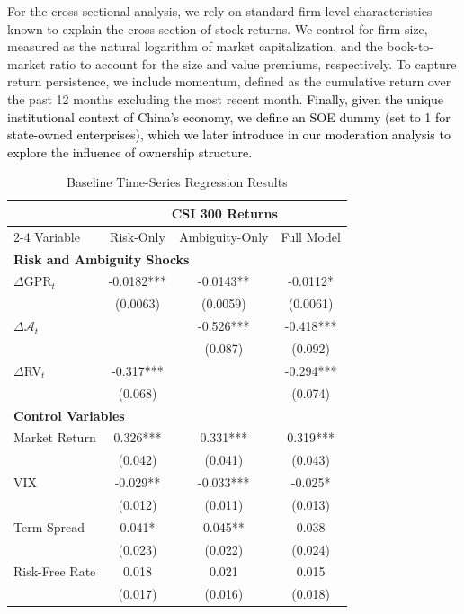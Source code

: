 \documentclass[preprint,12pt,authoryear]{elsarticle}
\begin{document}
For the cross-sectional analysis, we rely on standard firm-level characteristics known to explain the cross-section of stock returns. We control for firm size, measured as the natural logarithm of market capitalization, and the book-to-market ratio to account for the size and value premiums, respectively. To capture return persistence, we include momentum, defined as the cumulative return over the past 12 months excluding the most recent month. \textcolor{black}{Finally, given the unique institutional context of China's economy, we define an SOE dummy (set to 1 for state-owned enterprises), which we later introduce in our moderation analysis to explore the influence of ownership structure.}

\begin{table}[htbp]
\centering
\caption{Baseline Time-Series Regression Results}
\label{tab:baseline_ts}
\begin{threeparttable}
\begin{tabular*}{\textwidth}{@{\extracolsep{\fill}} lccc @{\extracolsep{\fill}}}
\toprule
& \multicolumn{3}{c}{CSI 300 Returns} \\
\cmidrule(lr){2-4}
Variable & Risk-Only & Ambiguity-Only & Full Model \\
\midrule
\midrule
\multicolumn{4}{l}{\textbf{Risk and Ambiguity Shocks}} \\
$\Delta$GPR$_t$ & -0.0182*** & -0.0143** & -0.0112* \\
& (0.0063) & (0.0059) & (0.0061) \\
$\Delta \mathcal{A}_{t}$ &  & -0.526*** & -0.418*** \\
&  & (0.087) & (0.092) \\
$\Delta$RV$_t$ & -0.317*** &  & -0.294*** \\
& (0.068) &   & (0.074) \\
\midrule
\multicolumn{4}{l}{\textbf{Control Variables}} \\
Market Return & 0.326*** & 0.331*** & 0.319*** \\
& (0.042) & (0.041) & (0.043) \\
VIX & -0.029** & -0.033*** & -0.025* \\
& (0.012) & (0.011) & (0.013) \\
Term Spread & 0.041* & 0.045** & 0.038 \\
& (0.023) & (0.022) & (0.024) \\
Risk-Free Rate & 0.018 & 0.021 & 0.015 \\
& (0.017) & (0.016) & (0.018) \\
\midrule

\end{tabular*}
\end{threeparttable}
\end{table}
\end{document}

